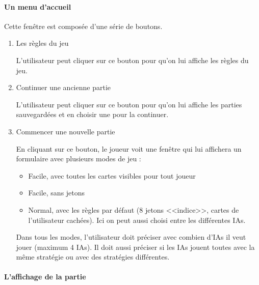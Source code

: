 \documentclass{article}
\begin{document}
\paragraph{Un menu d'accueil}
Cette fenêtre est composée d'une série de boutons.
\begin{enumerate}

 \item  {Les règles du jeu}
 
  {\normalfont L’utilisateur peut cliquer sur ce bouton pour qu’on lui affiche les règles du jeu.}


 \item  {Continuer une ancienne partie}
 
 {\normalfont L’utilisateur peut cliquer sur ce bouton pour qu’on lui affiche les parties sauvegardées et en choisir une pour la continuer.}

 
 \item  {Commencer une nouvelle partie}

{\normalfont En cliquant sur ce bouton, le joueur voit une fenêtre qui lui affichera un formulaire avec plusieurs modes de jeu : 

 \begin{itemize}
    \item Facile, avec toutes les cartes visibles pour tout joueur
    \item Facile, sans jetons
    \item Normal, avec les règles par défaut (8 jetons <<indice>>, cartes de l'utilisateur cachées). Ici on peut aussi choisi entre les différentes IAs.
 \end{itemize}

Dans tous les modes, l’utilisateur doit préciser avec combien d’IAs il veut jouer (maximum 4 IAs). Il doit aussi préciser si les IAs jouent toutes avec la même stratégie ou avec des stratégies différentes.}

\end{enumerate}

\paragraph{L’affichage de la partie}
\end{document}
